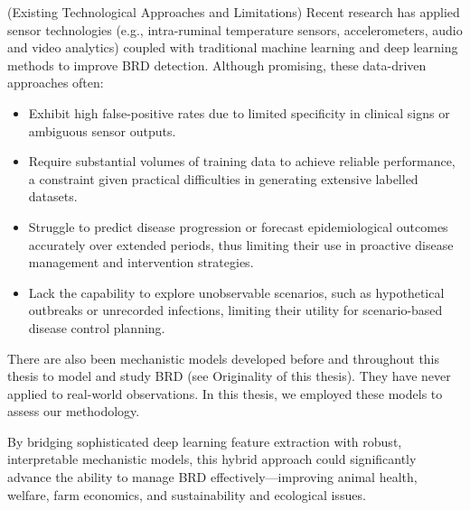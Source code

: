 (Existing Technological Approaches and Limitations) Recent research has applied sensor technologies (e.g., intra-ruminal temperature sensors, accelerometers, audio and video analytics) coupled with traditional machine learning and deep learning methods to improve BRD detection. Although promising, these data-driven approaches often:
\begin{itemize}
    \item Exhibit high false-positive rates due to limited specificity in clinical signs or ambiguous sensor outputs.
    \item Require substantial volumes of training data to achieve reliable performance, a constraint given practical difficulties in generating extensive labelled datasets.
    \item Struggle to predict disease progression or forecast epidemiological outcomes accurately over extended periods, thus limiting their use in proactive disease management and intervention strategies.
    \item Lack the capability to explore unobservable scenarios, such as hypothetical outbreaks or unrecorded infections, limiting their utility for scenario-based disease control planning.
\end{itemize}

There are also been mechanistic models developed before and throughout this thesis to model and study BRD (see Originality of this thesis). They have never applied to real-world observations. In this thesis, we employed these models to assess our methodology.



By bridging sophisticated deep learning feature extraction with robust, interpretable mechanistic models, this hybrid approach could significantly advance the ability to manage BRD effectively—improving animal health, welfare, farm economics, and sustainability and ecological issues. 

